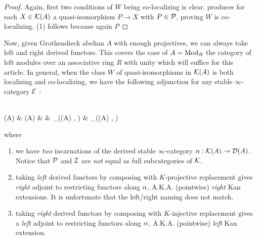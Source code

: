 \documentclass{article}
\begin{document}
\begin{proof}
  Again, first two conditions of $W$ being co-localizing is clear.
  \cite[Theorem 14.4.3]{KS06} produces for each $X \in \mathcal{K}(A)$
  a quasi-isomorphism $P \to X$ with $P \in \mathcal{P}$,
  proving $W$ is co-localizing.
  (1) follows because again $P$
\end{proof}
Now, given Grothendieck abelian $A$ with enough projectives,
we can always take left and right derived functors.
This covers the case of $A = \mathrm{Mod}_R$ the category of
left modules over an associative ring $R$ with unity which will
suffice for this article.
In general, when the class $W$ of quasi-isomorphisms in $\mathcal{K}(A)$
is both localizing and co-localizing, 
we have the following adjunction for any
stable $\infty$-category $\mathcal{E}$ : 
\begin{cd}
  {} \\
	{(A)} & {(A)} & \rightsquigarrow & {_{}((A) , )} & {_{}((A) , )} \\
	{}
	\arrow["\sim"', from=1-1, to=2-1]
	\arrow["p", shift left=2, from=1-1, to=2-2]
	\arrow["\bot"{marking, allow upside down}, draw=none, from=1-1, to=2-2]
	\arrow[shift left=2, from=2-2, to=1-1]
	\arrow["\al"{description}, from=2-2, to=2-1]
	\arrow[shift right=2, from=2-2, to=3-1]
	\arrow["{F \mapsto RF = F i}", shift left=5, from=2-4, to=2-5]
	\arrow["{F \mapsto LF = F p}"', shift right=5, from=2-4, to=2-5]
	\arrow["\bot"{description}, shift left=3, draw=none, from=2-4, to=2-5]
	\arrow["\bot"{description}, shift right=3, draw=none, from=2-4, to=2-5]
	\arrow["{\al^*}"{description}, from=2-5, to=2-4]
	\arrow["\sim", from=3-1, to=2-1]
	\arrow["i"', shift right=2, from=3-1, to=2-2]
	\arrow["\bot"{marking, allow upside down}, draw=none, from=3-1, to=2-2]
\end{cd}
where \begin{enumerate}
  \item we have \emph{two} incarnations of the derived stable $\infty$-category
  $\alpha: \mathcal{K}(A) \to \mathcal{D}(A)$.
  Notice that $\mathcal{P}$ and $\mathcal{I}$ are \emph{not} equal as 
  full subcategories of $\mathcal{K}$.
  \item taking \emph{left} derived functors by composing with $K$-projective
  replacement gives \emph{right} adjoint to restricting functors along $\alpha$,
  A.K.A. (pointwise) \emph{right} Kan extensions. 
  It is unfortunate that the left/right naming does not match.
  \item taking \emph{right} derived functors by composing with $K$-injective
  replacement gives a \emph{left} adjoint to restricting functors along $\alpha$,
  A.K.A. (pointwise) \emph{left} Kan extension.
\end{enumerate}
\end{document}
